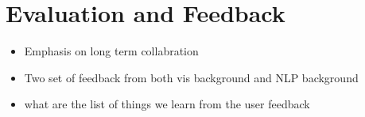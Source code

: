 \section{Evaluation and Feedback}

\begin{itemize}
\item Emphasis on long term collabration 
\item Two set of feedback from both vis background and NLP background
\item what are the list of things we learn from the user feedback
\end{itemize}
